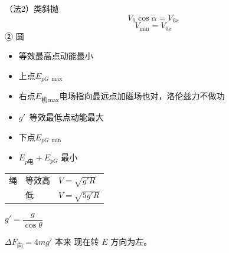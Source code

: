 \noindent （法2）类斜抛
\[ V_0\cos\alpha=V_{0x} \]
\[ V_{\min}=V_{0x} \]
\noindent ② 圆
\begin{itemize}
\item 等效最高点\quad 动能最小
\item 上点\quad $E_{pG\,\max}$
\item 右点\quad $E_{\text{机}\,\max}$\quad 电场指向最远点\qquad 加磁场也对，洛伦兹力不做功
\item $g'$\ 等效最低点\quad 动能最大
\item 下点\quad $E_{pG\,\min}$
\item $E_{p\text{电}}+E_{pG}$ 最小
\end{itemize}

\medskip
\noindent
\begin{tabular}{@{}lll@{}}
绳 & 等效高 & $V=\sqrt{g'R}$ \\
 & 低 & $V=\sqrt{5g'R}$
\end{tabular}
\qquad $g'=\dfrac{g}{\cos\theta}$

\noindent $\Delta F_{\text{向}}=4mg'$
\noindent 本来
\noindent 现在转 $E$ 方向为左。

